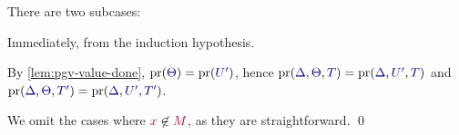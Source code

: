 \begin{case*}
  There are two subcases:
  \begin{subcase*}[$\tm{x}\in\tm{L}$]
    Immediately, from the induction hypothesis.
    \begin{mathpar}
    \end{mathpar}
  \end{subcase*}
  \begin{subcase*}[$\tm{x}\in\tm{M}$ and $\tm{x}\in\tm{N}$]
    By \cref{lem:pgv-value-done}, $\minpr(\ty{\Theta})=\minpr(\ty{U'})$, hence $\minpr(\ty{\Delta},\ty{\Theta},\ty{T})=\minpr(\ty{\Delta},\ty{U'},\ty{T})$ and $\minpr(\ty{\Delta},\ty{\Theta},\ty{T'})=\minpr(\ty{\Delta},\ty{U'},\ty{T'})$.
    \begin{mathpar}
    \end{mathpar}
  \end{subcase*}
\end{case*}
\noindent
We omit the cases where $\tm{x}\not\in\tm{M}$, as they are straightforward.
\qed


